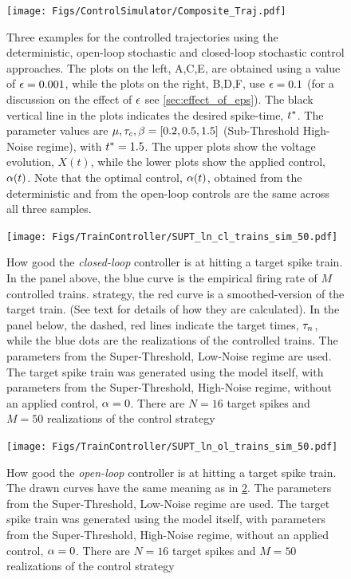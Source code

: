 \begin{figure}[h] 
\begin{center} 
\texttt{[image: Figs/ControlSimulator/Composite\_Traj.pdf]}  
\caption[]{Three examples for the controlled trajectories using the 
deterministic, open-loop stochastic and closed-loop stochastic control approaches. 
The plots on the left, A,C,E, are obtained using a value of ${\epsilon}=0.001$, 
while the plots on the right, B,D,F, use ${\epsilon}=0.1$ (for a discussion on the 
effect of ${\epsilon}$ see \cref{sec:effect_of_eps}). The black vertical line in the plots indicates the 
desired spike-time, ${ t^* }$. The parameter values are ${\mu }, { \tau_{c} }, {\beta} = [0.2, 0.5,  1.5]$ (Sub-Threshold 
High-Noise regime), with ${ t^* } = 1.5$.  
The upper plots show the voltage evolution, $X(t)$, while the lower 
plots show the applied control, ${\alpha}(t)$. Note that the optimal control, ${\alpha}(t)$, obtained from 
the deterministic and from the open-loop controls are the same across all three 
samples.} 
\label{fig:control_trajectories_examples}    
\end{center}   
\end{figure} 
\begin{figure}[htp] 
\begin{center} 
  \texttt{[image: Figs/TrainController/SUPT\_ln\_cl\_trains\_sim\_50.pdf]} 
  \caption[ ]{How good the {\sl closed-loop} controller is at hitting a target 
  spike train. In the panel above, the blue curve is the empirical firing 
  rate of $M$ controlled trains.   strategy, the red curve is a 
  smoothed-version of the target train. (See text for details of how they are calculated). In the panel below, the 
  dashed, red lines indicate the target times, ${\tau}_n$, while the blue dots are 
  the realizations of the controlled trains.   
  The parameters from the Super-Threshold, Low-Noise 
  regime are used. The target spike train was generated using the model itself, 
  with parameters from the Super-Threshold, High-Noise regime, without an applied 
  control, ${\alpha}=0$. 
  There are $N=16$ target spikes and $M=50$ realizations of the control strategy}  
  \label{fig:targettrain_cl_lownoise} 
\end{center} 
\end{figure}   
\begin{figure}[htp]  
\begin{center} 
  \texttt{[image: Figs/TrainController/SUPT\_ln\_ol\_trains\_sim\_50.pdf]} 
  \caption[ ]{How good the {\sl open-loop} controller is at hitting a target 
  spike train. 
  The drawn curves have  the same meaning as in 
  \cref{fig:targettrain_cl_lownoise}. 
  The parameters from the Super-Threshold, Low-Noise regime are used.  
  The target spike train was generated using the model itself, with parameters 
  from the Super-Threshold, High-Noise regime, without an applied control, ${\alpha}=0$. 
  There are $N=16$ target spikes and $M=50$ realizations of the control strategy} 
  \label{fig:targettrain_ol_lownoise} 
\end{center}  
\end{figure} 
